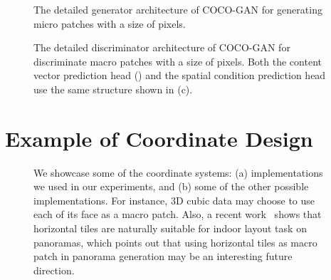 \documentclass{article}
\newcommand{\modelName}{COCO-GAN }
\begin{document}
\begin{appendices}
    \begin{figure}[H]
        \vspace{-1em}
        \hfill {}\hfill {}\hfill
        \caption{The detailed generator architecture of \modelName for generating micro patches with a size of  pixels.}
        \label{fig:architecture-detail-G}
        \vspace{-1em}
    \end{figure}
\begin{figure}[H]
        \centering
        \hfill {}\vspace{2em}
        \vspace{1em}
        
        \caption{The detailed discriminator architecture of \modelName for discriminate macro patches with a size of  pixels. Both the content vector prediction head () and the spatial condition prediction head use the same structure shown in (c).}
        \label{fig:architecture-detail-D}
    \end{figure}
    

\section{Example of Coordinate Design}
    \label{appendix:coordinate-example}
\begin{figure}[H]
        \centering
         \hfill {}
        \caption{We showcase some of the coordinate systems: (a) implementations we used in our experiments, and (b) some of the other possible implementations. For instance, 3D cubic data may choose to use each of its face as a macro patch. Also, a recent work~\cite{sun2019horizonnet} shows that horizontal tiles are naturally suitable for indoor layout task on panoramas, which points out that using horizontal tiles as macro patch in panorama generation may be an interesting future direction.}
    \end{figure}
    

\end{appendices}
\end{document}
